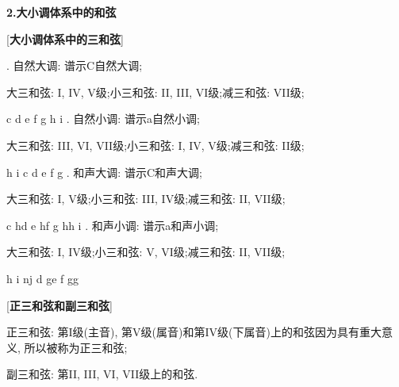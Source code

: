 \clearpage

\begin{center}
 \textbf{2.大小调体系中的和弦}\\
\end{center}

[\textbf{大小调体系中的三和弦}]\par
{}. 自然大调: 谱示C自然大调;\par
\qquad \qquad 大三和弦: I, IV, V级;\qquad 小三和弦: II, III, VI级;\qquad 减三和弦: VII级;\par
\startextract
\Notes {} \wh c \en
\Notes {} \wh d \en
\Notes {} \wh e \en
\Notes {} \wh f \en
\Notes {} \wh g \en
\Notes {} \wh h \en
\Notes {} \wh i \en
\zendextract
{}. 自然小调: 谱示a自然小调;\par
\qquad \qquad 大三和弦: III, VI, VII级;\qquad 小三和弦: I, IV, V级;\qquad 减三和弦: II级;\par
\startextract
\Notes {} \wh h \en
\Notes {} \wh i \en
\Notes {} \wh c \en
\Notes {} \wh d \en
\Notes {} \wh e \en
\Notes {} \wh f \en
\Notes {} \wh g \en
\zendextract
{}. 和声大调: 谱示C和声大调;\par
\qquad \qquad 大三和弦: I, V级;\qquad 小三和弦: III, IV级;\qquad 减三和弦: II, VII级;\par
\startextract
\Notes {} \wh c \en
\Notes {} \fl h\wh d \en
\Notes {} \wh e \en
\Notes {} \fl h\wh f \en
\Notes {} \wh g \en
\Notes {} \fl h\wh h \en
\Notes {} \wh i \en
\zendextract
{}. 和声小调: 谱示a和声小调;\par
\qquad \qquad 大三和弦: I, IV级;\qquad 小三和弦: V, VI级;\qquad 减三和弦: II, VII级;\par
\startextract
\Notes {} \wh h \en
\Notes {} \wh i \en
\Notes {} \sh n\wh j \en
\Notes {} \wh d \en
\Notes {} \sh g\wh e \en
\Notes {} \wh f \en
\Notes {} \sh g\wh g \en
\zendextract

[\textbf{正三和弦和副三和弦}] \par
\qquad 正三和弦: 第I级(主音), 第V级(属音)和第IV级(下属音)上的和弦因为具有重大意义, 所以被称为正三和弦;\par
\qquad 副三和弦: 第II, III, VI, VII级上的和弦.\par

